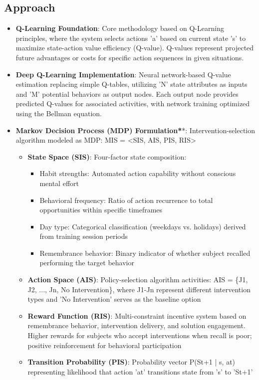 \subsection*{Approach}
\begin{itemize}
    \item \textbf{Q-Learning Foundation}: Core methodology based on Q-Learning principles, where the system selects actions 'a' based on current state 's' to maximize state-action value efficiency (Q-value). Q-values represent projected future advantages or costs for specific action sequences in given situations.
    \item \textbf{Deep Q-Learning Implementation}: Neural network-based Q-value estimation replacing simple Q-tables, utilizing 'N' state attributes as inputs and 'M' potential behaviors as output nodes. Each output node provides predicted Q-values for associated activities, with network training optimized using the Bellman equation.
    \item \textbf{Markov Decision Process (MDP) Formulation*}*: Intervention-selection algorithm modeled as MDP: MIS = <SIS, AIS, PIS, RIS>
    \begin{itemize}
        \item \textbf{State Space (SIS)}: Four-factor state composition:
        \begin{itemize}
            \item Habit strengths: Automated action capability without conscious mental effort
            \item Behavioral frequency: Ratio of action recurrence to total opportunities within specific timeframes
            \item Day type: Categorical classification (weekdays vs. holidays) derived from training session periods
            \item Remembrance behavior: Binary indicator of whether subject recalled performing the target behavior
        \end{itemize}
        \item \textbf{Action Space (AIS)}: Policy-selection algorithm activities: AIS = \{J1, J2, ..., Jn, No Intervention\}, where J1-Jn represent different intervention types and 'No Intervention' serves as the baseline option
        \item \textbf{Reward Function (RIS)}: Multi-constraint incentive system based on remembrance behavior, intervention delivery, and solution engagement. Higher rewards for subjects who accept interventions when recall is poor; positive reinforcement for behavioral participation
        \item \textbf{Transition Probability (PIS)}: Probability vector P(St+1 | s, at) representing likelihood that action 'at' transitions state from 's' to 'St+1'
    \end{itemize}
\end{itemize}

